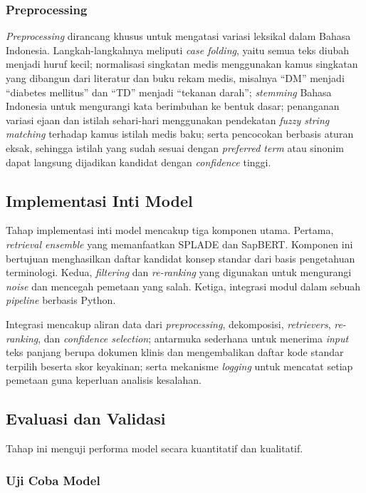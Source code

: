 \subsubsection{Preprocessing}

\textit{Preprocessing} dirancang khusus untuk mengatasi variasi leksikal dalam Bahasa Indonesia. Langkah-langkahnya meliputi \textit{case folding}, yaitu semua teks diubah menjadi huruf kecil; normalisasi singkatan medis menggunakan kamus singkatan yang dibangun dari literatur dan buku rekam medis, misalnya ``DM'' menjadi ``diabetes mellitus'' dan ``TD'' menjadi ``tekanan darah''; \textit{stemming} Bahasa Indonesia untuk mengurangi kata berimbuhan ke bentuk dasar; penanganan variasi ejaan dan istilah sehari-hari menggunakan pendekatan \textit{fuzzy string matching} terhadap kamus istilah medis baku; serta pencocokan berbasis aturan eksak, sehingga istilah yang sudah sesuai dengan \textit{preferred term} atau sinonim dapat langsung dijadikan kandidat dengan \textit{confidence} tinggi.

\subsection{Implementasi Inti Model}

Tahap implementasi inti model mencakup tiga komponen utama. Pertama, \textit{retrieval ensemble} yang memanfaatkan SPLADE dan SapBERT. Komponen ini bertujuan menghasilkan daftar kandidat konsep standar dari basis pengetahuan terminologi. Kedua, \textit{filtering} dan \textit{re-ranking} yang digunakan untuk mengurangi \textit{noise} dan mencegah pemetaan yang salah. Ketiga, integrasi modul dalam sebuah \textit{pipeline} berbasis Python.

Integrasi mencakup aliran data dari \textit{preprocessing}, dekomposisi, \textit{retrievers}, \textit{re-ranking}, dan \textit{confidence selection}; antarmuka sederhana untuk menerima \textit{input} teks panjang berupa dokumen klinis dan mengembalikan daftar kode standar terpilih beserta skor keyakinan; serta mekanisme \textit{logging} untuk mencatat setiap pemetaan guna keperluan analisis kesalahan.

\subsection{Evaluasi dan Validasi}

Tahap ini menguji performa model secara kuantitatif dan kualitatif.

\subsubsection{Uji Coba Model}

